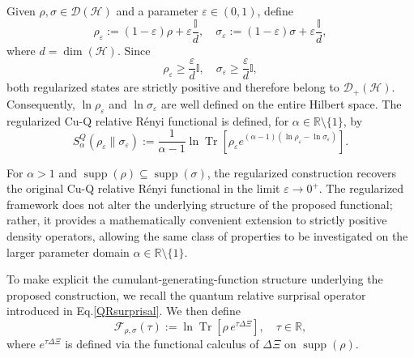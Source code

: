\documentclass[a4paper, amsfonts, amssymb, amsmath, reprint, showkeys, nofootinbib, twoside, aps, pra]{revtex4-2}
\theoremstyle{definition}
\begin{document}
Given $\rho,\sigma\in\mathcal D(\mathcal H)$ and a parameter
$\varepsilon\in(0,1)$, define
\begin{equation}\label{state_regularized}
\rho_\varepsilon
:=
(1-\varepsilon)\rho
+
\varepsilon\frac{\mathbb{I}}{d},
\quad
\sigma_\varepsilon
:=
(1-\varepsilon)\sigma
+
\varepsilon\frac{\mathbb{I}}{d},
\end{equation}
where $d=\dim(\mathcal H)$. Since
\begin{equation}
\rho_\varepsilon
\ge
\frac{\varepsilon}{d}{\mathbb{I}},
\quad
\sigma_\varepsilon
\ge
\frac{\varepsilon}{d}{\mathbb{I}},
\end{equation}
both regularized states are strictly positive and therefore belong to
$\mathcal D_+(\mathcal H)$. Consequently,
$\ln\rho_\varepsilon$ and $\ln\sigma_\varepsilon$ are well defined on the entire Hilbert space. The regularized Cu-Q relative Rényi functional is defined,
for $\alpha\in\mathbb R\setminus\{1\}$, by
\begin{equation}\label{regularized_Cu-Q}
S^{Q}_{\alpha}(\rho_\varepsilon\|\sigma_\varepsilon)
:=
\frac{1}{\alpha-1}
\ln
\operatorname{Tr}
\!\left[
\rho_\varepsilon
e^{(\alpha-1)
(\ln\rho_\varepsilon-\ln\sigma_\varepsilon)}
\right].
\end{equation}

For $\alpha>1$ and
$\operatorname{supp}(\rho)\subseteq\operatorname{supp}(\sigma)$, the regularized construction recovers the original Cu-Q relative Rényi functional in the limit $\varepsilon\to0^+$. The regularized framework does not alter the underlying structure of the proposed functional; rather, it provides a mathematically convenient extension to strictly positive density operators, allowing the same class of
properties to be investigated on the larger parameter domain $\alpha\in\mathbb{R}\setminus\{1\}$. 

To make explicit the cumulant-generating-function structure underlying the proposed construction, we recall the quantum relative surprisal
operator introduced in Eq.\eqref{QRsurprisal}. We then define 
\begin{equation}
\label{eq:CGF}
    \mathcal{F}_{\rho,\sigma}(\tau)
    :=
    \ln\operatorname{Tr}\!\left[
        \rho\, e^{\tau\Delta\Xi}
    \right],
    \quad \tau\in\mathbb{R},
\end{equation}
where $e^{\tau\Delta\Xi}$ is defined via the functional calculus of $\Delta\Xi$ on $\operatorname{supp}(\rho)$.
\end{document}

